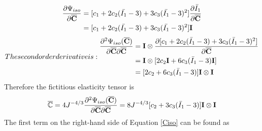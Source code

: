 \begin{equation}
\begin{split}
\frac{\partial{\Psi_{iso}}}{\partial{\overline{\bold{C}}}} 
&= [c_1 + 2c_2(\bar{I_1} - 3) + 3c_3(\bar{I_1} - 3)^2] \frac{\partial{\bar{I}_1}}{\partial{\overline{\bold{C}}}} \\
&= [c_1 + 2c_2(\bar{I_1} - 3) + 3c_3(\bar{I_1} - 3)^2] \bold{I} 
\end{split}
\end{equation}
\begin{equation}
The second order derivative is:
\begin{split}
\frac{\partial^2\Psi_{iso}(\overline{\bold{C}})}{\partial\overline{\bold{C}}\partial\overline{\bold{C}}} &= 
\bold{I} \otimes \frac{\partial[c_1 + 2c_2({\bar{I}}_1-3) + 3c_3({\bar{I}}_1-3)^2 ]}{\partial{\overline{\bold{C}}}} \\
&= \bold{I} \otimes [2c_2\bold{I} + 6c_3({\bar{I}}_1-3)\bold{I}]\\
&= [2c_2 + 6c_3({\bar{I}}_1-3)] \bold{I} \otimes \bold{I}
\end{split}
\end{equation}
Therefore the fictitious elasticity tensor is
\begin{equation}
\overline{\mathbb{C}} = 4J^{-4/3}\frac{\partial^2\Psi_{iso}(\overline{\bold{C}})}{\partial{\overline{\bold{C}}}{\partial{\overline{\bold{C}}}}} = 8J^{-4/3}[c_2 + 3c_3({\bar{I}}_1 - 3) ]\bold{I} \otimes \bold{I}
\end{equation}
The first term on the right-hand side of Equation \ref{Ciso} can be found as

